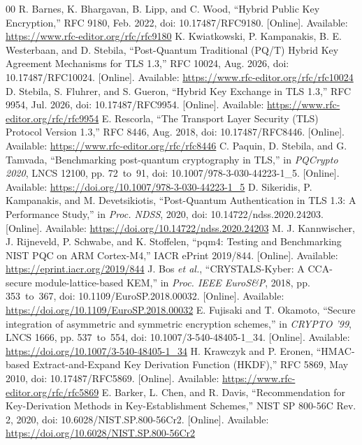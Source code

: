 \documentclass[journal, 10pt]{IEEEtran}
\begin{document}
\begin{thebibliography}{00}
 R. Barnes, K. Bhargavan, B. Lipp, and C. Wood, ``Hybrid Public Key Encryption,'' RFC 9180, Feb. 2022, doi: 10.17487/RFC9180. [Online]. Available: \url{https://www.rfc-editor.org/rfc/rfc9180}
 K. Kwiatkowski, P. Kampanakis, B. E. Westerbaan, and D. Stebila, ``Post-Quantum Traditional (PQ/T) Hybrid Key Agreement Mechanisms for TLS 1.3,'' RFC 10024, Aug. 2026, doi: 10.17487/RFC10024. [Online]. Available: \url{https://www.rfc-editor.org/rfc/rfc10024}
 D. Stebila, S. Fluhrer, and S. Gueron, ``Hybrid Key Exchange in TLS 1.3,'' RFC 9954, Jul. 2026, doi: 10.17487/RFC9954. [Online]. Available: \url{https://www.rfc-editor.org/rfc/rfc9954}
 E. Rescorla, ``The Transport Layer Security (TLS) Protocol Version 1.3,'' RFC 8446, Aug. 2018, doi: 10.17487/RFC8446. [Online]. Available: \url{https://www.rfc-editor.org/rfc/rfc8446}
 C. Paquin, D. Stebila, and G. Tamvada, ``Benchmarking post-quantum cryptography in TLS,'' in \textit{PQCrypto 2020}, LNCS 12100, pp. 72~to~91, doi: 10.1007/978-3-030-44223-1\_5. [Online]. Available: \url{https://doi.org/10.1007/978-3-030-44223-1_5}
 D. Sikeridis, P. Kampanakis, and M. Devetsikiotis, ``Post-Quantum Authentication in TLS 1.3: A Performance Study,'' in \textit{Proc. NDSS}, 2020, doi: 10.14722/ndss.2020.24203. [Online]. Available: \url{https://doi.org/10.14722/ndss.2020.24203}
 M. J. Kannwischer, J. Rijneveld, P. Schwabe, and K. Stoffelen, ``pqm4: Testing and Benchmarking NIST PQC on ARM Cortex-M4,'' IACR ePrint 2019/844. [Online]. Available: \url{https://eprint.iacr.org/2019/844}
 J. Bos \textit{et al.}, ``CRYSTALS-Kyber: A CCA-secure module-lattice-based KEM,'' in \textit{Proc. IEEE EuroS\&P}, 2018, pp. 353~to~367, doi: 10.1109/EuroSP.2018.00032. [Online]. Available: \url{https://doi.org/10.1109/EuroSP.2018.00032}
 E. Fujisaki and T. Okamoto, ``Secure integration of asymmetric and symmetric encryption schemes,'' in \textit{CRYPTO '99}, LNCS 1666, pp. 537~to~554, doi: 10.1007/3-540-48405-1\_34. [Online]. Available: \url{https://doi.org/10.1007/3-540-48405-1_34}
 H. Krawczyk and P. Eronen, ``HMAC-based Extract-and-Expand Key Derivation Function (HKDF),'' RFC 5869, May 2010, doi: 10.17487/RFC5869. [Online]. Available: \url{https://www.rfc-editor.org/rfc/rfc5869}
 E. Barker, L. Chen, and R. Davis, ``Recommendation for Key-Derivation Methods in Key-Establishment Schemes,'' NIST SP 800-56C Rev. 2, 2020, doi: 10.6028/NIST.SP.800-56Cr2. [Online]. Available: \url{https://doi.org/10.6028/NIST.SP.800-56Cr2}

\end{thebibliography}
\end{document}

